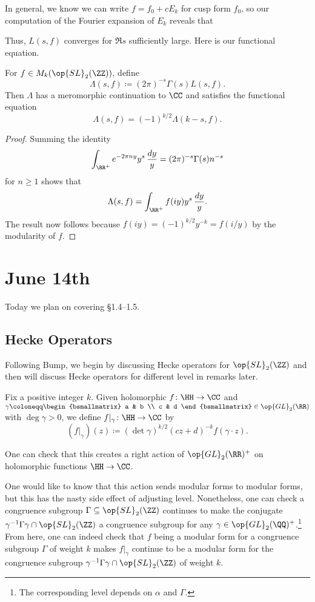 \documentclass{article}
\begin{document}
\begin{remark}
	In general, we know we can write $f=f_0+cE_k$ for cusp form $f_0$, so our computation of the Fourier expansion of $E_k$ reveals that 
\end{remark}
Thus, $L(s,f)$ converges for $\Re s$ sufficiently large. Here is our functional equation.
\begin{theorem}
	For $f\in M_k(\op{SL}_2(\ZZ))$, define
	\[\Lambda(s,f)\coloneqq(2\pi)^{-s}\Gamma(s)L(s,f).\]
	Then $\Lambda$ has a meromorphic continuation to $\CC$ and satisfies the functional equation
	\[\Lambda(s,f)=(-1)^{k/2}\Lambda(k-s,f).\]
\end{theorem}
\begin{proof}
	Summing the identity
	\[\int_{\RR^+}e^{-2\pi ny}y^s\,\frac{dy}y=(2\pi)^{-s}\Gamma(s)n^{-s}\]
	for $n\ge1$ shows that
	\[\Lambda(s,f)=\int_{\RR^+}f(iy)y^s\,\frac{dy}y.\]
	The result now follows because $f(iy)=(-1)^{k/2}y^{-k}=f(i/y)$ by the modularity of $f$.
\end{proof}

\section{June 14th}
Today we plan on covering \S1.4--1.5.

\subsection{Hecke Operators}
Following Bump, we begin by discussing Hecke operators for $\op{SL}_2(\ZZ)$ and then will discuss Hecke operators for different level in remarks later.
\begin{notation}
	Fix a positive integer $k$. Given holomorphic $f\colon\HH\to\CC$ and $\gamma\coloneqq\begin{bsmallmatrix}
		a & b \\ c & d
	\end{bsmallmatrix}\in\op{GL}_2(\RR)$ with $\deg\gamma>0$, we define $f|_\gamma\colon\HH\to\CC$ by
	\[(f|_\gamma)(z)\coloneqq(\det\gamma)^{k/2}(cz+d)^{-k}f(\gamma\cdot z).\]
\end{notation}
One can check that this creates a right action of $\op{GL}_2(\RR)^+$ on holomorphic functions $\HH\to\CC$.

One would like to know that this action sends modular forms to modular forms, but this has the nasty side effect of adjusting level. Nonetheless, one can check a congruence subgroup $\Gamma\subseteq\op{SL}_2(\ZZ)$ continues to make the conjugate $\gamma^{-1}\Gamma\gamma\cap\op{SL}_2(\ZZ)$ a congruence subgroup for any $\gamma\in\op{GL}_2(\QQ)^+$.\footnote{The corresponding level depends on $\alpha$ and $\Gamma$.} From here, one can indeed check that $f$ being a modular form for a congruence subgroup $\Gamma$ of weight $k$ makes $f|_\gamma$ continue to be a modular form for the congruence subgroup $\gamma^{-1}\Gamma\gamma\cap\op{SL}_2(\ZZ)$ of weight $k$.
\end{document}
